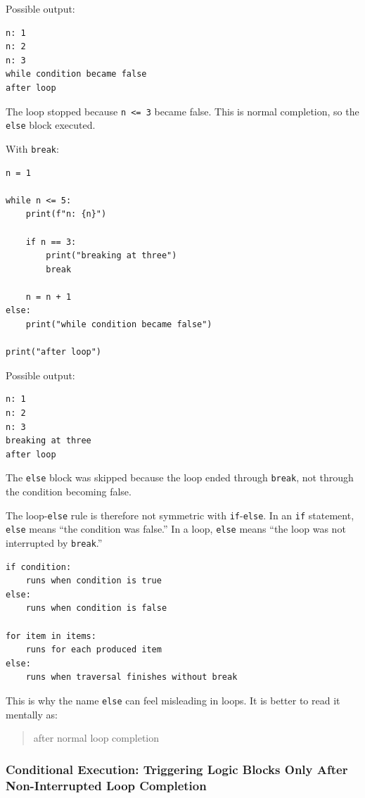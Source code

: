 Possible output:

\begin{verbatim}
n: 1
n: 2
n: 3
while condition became false
after loop
\end{verbatim}

The loop stopped because \texttt{n <= 3} became false. This is normal completion, so the \texttt{else} block executed.

With \texttt{break}:

\begin{verbatim}
n = 1

while n <= 5:
    print(f"n: {n}")

    if n == 3:
        print("breaking at three")
        break

    n = n + 1
else:
    print("while condition became false")

print("after loop")
\end{verbatim}

Possible output:

\begin{verbatim}
n: 1
n: 2
n: 3
breaking at three
after loop
\end{verbatim}

The \texttt{else} block was skipped because the loop ended through \texttt{break}, not through the condition becoming false.

The loop-\texttt{else} rule is therefore not symmetric with \texttt{if}-\texttt{else}. In an \texttt{if} statement, \texttt{else} means ``the condition was false.'' In a loop, \texttt{else} means ``the loop was not interrupted by \texttt{break}.''

\begin{verbatim}
if condition:
    runs when condition is true
else:
    runs when condition is false

for item in items:
    runs for each produced item
else:
    runs when traversal finishes without break
\end{verbatim}

This is why the name \texttt{else} can feel misleading in loops. It is better to read it mentally as:

\begin{quote}
after normal loop completion
\end{quote}

\subsubsection{Conditional Execution: Triggering Logic Blocks Only After Non-Interrupted Loop Completion}

